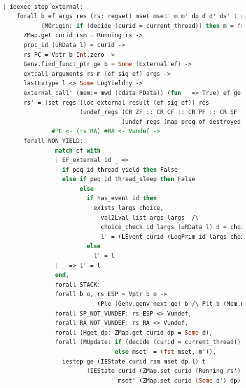 \begin{lstlisting}[language=Caml]
                          
  | ieexec_step_external:
      forall b ef args res (rs: regset) mset mset' m m' dp d d' ds' t rs' curid rsm l l'
             (MOrigin: if (decide (curid = current_thread)) then m = fst mset else m = snd mset),
        ZMap.get curid rsm = Running rs ->
        proc_id (uRData l) = curid ->
        rs PC = Vptr b Int.zero ->
        Genv.find_funct_ptr ge b = Some (External ef) ->
        extcall_arguments rs m (ef_sig ef) args ->
        lastEvType l <> Some LogYieldTy ->
        external_call' (mem:= mwd (cdata PData)) (fun _ => True) ef ge args (m, (uRData l, d)) t res (m', (ds',d')) ->
        rs' = (set_regs (loc_external_result (ef_sig ef)) res 
                        (undef_regs (CR ZF :: CR CF :: CR PF :: CR SF :: CR OF :: nil)
                                    (undef_regs (map preg_of destroyed_at_call) rs))) 
                #PC <- (rs RA) #RA <- Vundef ->
        forall NON_YIELD: 
                 match ef with
                 | EF_external id _ => 
                   if peq id thread_yield then False
                   else if peq id thread_sleep then False
                        else
                          if has_event id then
                            exists largs choice,
                              val2Lval_list args largs  /\
                              choice_check id largs (uRData l) d = choice /\ 
                              l' = (LEvent curid (LogPrim id largs choice (snap_func d)) :: l) 
                          else
                            l' = l
                 | _ => l' = l
                 end,
                 forall STACK:
                 forall b o, rs ESP = Vptr b o ->
                             (Ple (Genv.genv_next ge) b /\ Plt b (Mem.nextblock m)),
                 forall SP_NOT_VUNDEF: rs ESP <> Vundef,
                 forall RA_NOT_VUNDEF: rs RA <> Vundef,
                 forall (Hget_dp: ZMap.get curid dp = Some d),
                 forall (MUpdate: if (decide (curid = current_thread)) then mset' = (m', snd mset)
                                  else mset' = (fst mset, m')),
                   iestep ge (IEState curid rsm mset dp l) t 
                          (IEState curid (ZMap.set curid (Running rs') rsm) 
                                   mset' (ZMap.set curid (Some d') dp) l')

\end{lstlisting}

